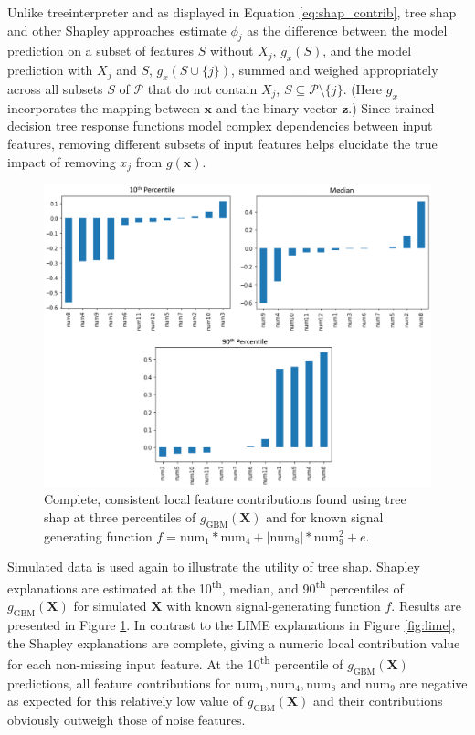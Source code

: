 \documentclass[11pt]{asaproc}
\begin{document}
\noindent Unlike treeinterpreter and as displayed in Equation \ref{eq:shap_contrib}, tree shap and other Shapley approaches estimate $\phi_j$ as the difference between the model prediction on a subset of features $S$ without $X_j$, $g_x(S)$, and the model prediction with $X_j$ and $S$, $g_x(S \cup \{j\})$, summed and weighed appropriately across all subsets $S$ of $\mathcal{P}$ that do not contain $X_j$, $S \subseteq \mathcal{P} \setminus \{j\}$. (Here $g_x$ incorporates the mapping between $\mathbf{x}$ and the binary vector $\mathbf{z}$.) Since trained decision tree response functions model complex dependencies between input features, removing different subsets of input features helps elucidate the true impact of removing $x_j$ from $g(\mathbf{x})$.

\begin{figure}[htb]
	\begin{center}
		\includegraphics[scale=0.6]{img/figure_6.eps}
		\caption{Complete, consistent local feature contributions found using tree shap at three percentiles of $g_{\text{GBM}}(\mathbf{X})$ and for known signal generating function $f = \text{num} _1 * \text{num}_4 + |\text{num}_8| * \text{num}_9^2 + e$.}
		\label{fig:shap}
	\end{center}
\end{figure}

Simulated data is used again to illustrate the utility of tree shap. Shapley explanations are estimated at the 10\textsuperscript{th}, median, and 90\textsuperscript{th} percentiles of $g_{\text{GBM}}(\mathbf{X})$ for simulated $\mathbf{X}$ with known signal-generating function $f$. Results are presented in Figure \ref{fig:shap}. In contrast to the LIME explanations in Figure \ref{fig:lime}, the Shapley explanations are complete, giving a numeric local contribution value for each non-missing input feature. At the 10\textsuperscript{th} percentile of $g_{\text{GBM}}(\mathbf{X})$ predictions, all feature contributions for $\text{num}_1, \text{num}_4, \text{num}_8$ and $\text{num}_9$ are negative as expected for this relatively low value of $g_{\text{GBM}}(\mathbf{X})$ and their contributions obviously outweigh those of noise features.
\end{document}
